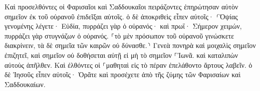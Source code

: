 \documentclass{openreader}
\begin{document}
Καὶ προσελθόντες οἱ Φαρισαῖοι καὶ Σαδδουκαῖοι πειράζοντες ἐπηρώτησαν αὐτὸν σημεῖον ἐκ τοῦ οὐρανοῦ ἐπιδεῖξαι αὐτοῖς. 
ὁ δὲ ἀποκριθεὶς εἶπεν αὐτοῖς· ⸂Ὀψίας γενομένης λέγετε· Εὐδία, πυρράζει γὰρ ὁ οὐρανός· 
καὶ πρωΐ· Σήμερον χειμών, πυρράζει γὰρ στυγνάζων ὁ οὐρανός. ⸀τὸ μὲν πρόσωπον τοῦ οὐρανοῦ γινώσκετε διακρίνειν, τὰ δὲ σημεῖα τῶν καιρῶν οὐ δύνασθε.⸃ 
Γενεὰ πονηρὰ καὶ μοιχαλὶς σημεῖον ἐπιζητεῖ, καὶ σημεῖον οὐ δοθήσεται αὐτῇ εἰ μὴ τὸ σημεῖον ⸀Ἰωνᾶ. καὶ καταλιπὼν αὐτοὺς ἀπῆλθεν. 
Καὶ ἐλθόντες οἱ ⸀μαθηταὶ εἰς τὸ πέραν ἐπελάθοντο ἄρτους λαβεῖν. 
ὁ δὲ Ἰησοῦς εἶπεν αὐτοῖς· Ὁρᾶτε καὶ προσέχετε ἀπὸ τῆς ζύμης τῶν Φαρισαίων καὶ Σαδδουκαίων. 
\end{document}
